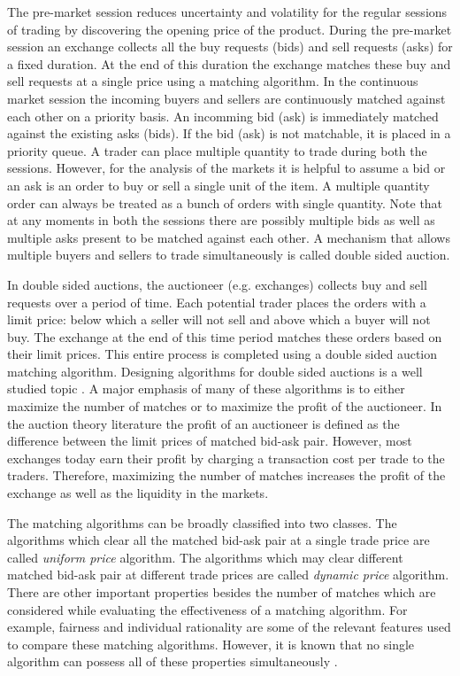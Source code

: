 \documentclass[a4paper,UKenglish,cleveref, autoref]{lipics-v2019}
\begin{document}
The pre-market session reduces uncertainty and volatility for the regular sessions of trading by discovering the opening price of the product. During the pre-market session an exchange collects all the buy requests (bids) and sell requests (asks) for a fixed duration. At the end of this duration the exchange matches these buy and sell requests at a single price using a matching algorithm. In the continuous market session the incoming buyers and sellers are continuously matched against each other on a priority basis. An incomming bid (ask) is immediately matched against the existing asks (bids). If the bid (ask) is not matchable, it is placed in a priority queue. A trader can place multiple quantity to trade during both the sessions. However, for the analysis of the markets it is helpful to assume a bid or an ask is an order to buy or sell a single unit of the item. A multiple quantity order can always be treated as a bunch of orders with single quantity. Note that at any moments in both the sessions there are possibly multiple bids as well as multiple asks present to be matched against each other. A mechanism that allows multiple buyers and sellers to trade simultaneously \cite{friedman} is called double sided auction.

In double sided auctions, the auctioneer (e.g. exchanges) collects buy and sell requests over a period of time. Each potential trader places the orders with a limit price: below which a seller will not sell and above which a buyer will not buy. The exchange at the end of this time period matches these orders based on their limit prices. This entire process is completed using a double sided auction matching algorithm. Designing algorithms for double sided auctions is a well studied topic \cite{mcafee1992, WurmanWW98,NiuP13}. A major emphasis of many of these algorithms is to either maximize the number of matches or to maximize the profit of the auctioneer. In the auction theory literature the profit of an auctioneer is defined as the difference between the limit prices of matched bid-ask pair. However, most exchanges today earn their profit by charging a transaction cost per trade to the traders. Therefore, maximizing the number of matches increases the profit of the exchange as well as the liquidity in the markets.  

The matching algorithms can be broadly classified into two classes. The algorithms which clear all the matched bid-ask pair at a single trade price are called \emph{uniform price} algorithm. The algorithms which may clear different matched bid-ask pair at different trade prices are called  \emph{dynamic price} algorithm. There are other important properties besides the number of matches which are considered while evaluating the effectiveness of a matching algorithm. For example, fairness and individual rationality are some of the relevant features used to compare these matching algorithms. However, it is known that no single algorithm can possess all of these properties simultaneously \cite{WurmanWW98,mcafee1992}. 
\end{document}
